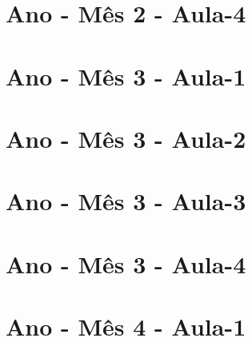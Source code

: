 \begin{multicols}{2}
\section[\sffamily 4\textordmasculine\space Ano - M\^{e}s 2 - Aula-4]{\textordmasculine\space Ano - M\^{e}s 2 - Aula-4}


\section[\sffamily 4\textordmasculine\space Ano - M\^{e}s 3 - Aula-1]{\textordmasculine\space Ano - M\^{e}s 3 - Aula-1}


\section[\sffamily 4\textordmasculine\space Ano - M\^{e}s 3 - Aula-2]{\textordmasculine\space Ano - M\^{e}s 3 - Aula-2}


\section[\sffamily 4\textordmasculine\space Ano - M\^{e}s 3 - Aula-3]{\textordmasculine\space Ano - M\^{e}s 3 - Aula-3}



\section[\sffamily 4\textordmasculine\space Ano - M\^{e}s 3 - Aula-4]{\textordmasculine\space Ano - M\^{e}s 3 - Aula-4}


\end{multicols}

\vfill\null
\pagebreak

\section[\sffamily 4\textordmasculine\space Ano - M\^{e}s 4 - Aula-1]{\textordmasculine\space Ano - M\^{e}s 4 - Aula-1}


